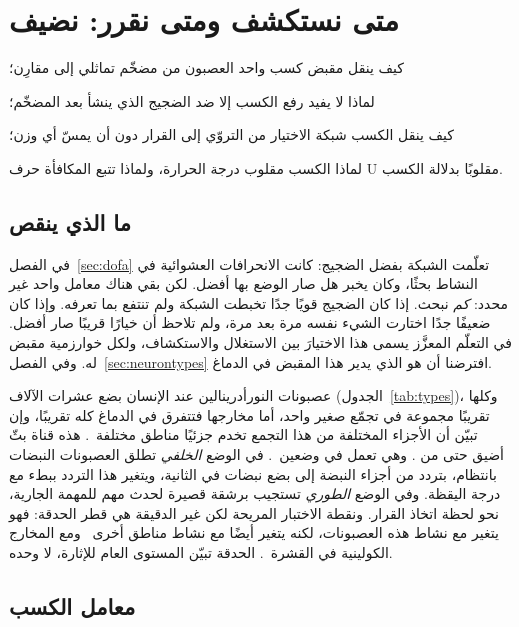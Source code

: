 \chapter{متى نستكشف ومتى نقرر: نضيف }
\label{sec:nora}
\begin{chaptergoals}
\item كيف ينقل مقبض كسب واحد العصبون من مضخّم تماثلي إلى مقارِن؛
\item لماذا لا يفيد رفع الكسب إلا ضد الضجيج الذي ينشأ بعد المضخّم؛
\item كيف ينقل الكسب شبكة الاختيار من التروّي إلى القرار دون أن يمسّ أي وزن؛
\item لماذا الكسب مقلوب درجة الحرارة، ولماذا تتبع المكافأة حرف U مقلوبًا بدلالة الكسب.
\end{chaptergoals}

\section{ما الذي ينقص}

في الفصل~\ref{sec:dofa} تعلّمت الشبكة بفضل الضجيج: كانت الانحرافات العشوائية في النشاط بحثًا، وكان  يخبر هل صار الوضع بها أفضل. لكن بقي هناك معامل واحد غير محدد: \emph{كم} نبحث. إذا كان الضجيج قويًا جدًا تخبطت الشبكة ولم تنتفع بما تعرفه. وإذا كان ضعيفًا جدًا اختارت الشيء نفسه مرة بعد مرة، ولم تلاحظ أن خيارًا قريبًا صار أفضل. في التعلّم المعزَّز يسمى هذا الاختيارَ بين الاستغلال والاستكشاف، ولكل خوارزمية مقبض له. وفي الفصل~\ref{sec:neurontypes} افترضنا أن  هو الذي يدير هذا المقبض في الدماغ.

عصبونات النورأدرينالين عند الإنسان بضع عشرات الآلاف (الجدول~\ref{tab:types})، وكلها تقريبًا مجموعة في تجمّع صغير واحد، أما مخارجها فتتفرق في الدماغ كله تقريبًا، وإن تبيّن أن الأجزاء المختلفة من هذا التجمع تخدم جزئيًا مناطق مختلفة~\cite{Poe2020}. هذه قناة بثّ أضيق حتى من . وهي تعمل في وضعين~\cite{AstonJones2005}. في الوضع \emph{الخلفي} تطلق العصبونات النبضات بانتظام، بتردد من أجزاء النبضة إلى بضع نبضات في الثانية، ويتغير هذا التردد ببطء مع درجة اليقظة. وفي الوضع \emph{الطوري} تستجيب برشقة قصيرة لحدث مهم للمهمة الجارية، نحو لحظة اتخاذ القرار. ونقطة الاختبار المريحة لكن غير الدقيقة هي قطر الحدقة: فهو يتغير مع نشاط هذه العصبونات، لكنه يتغير أيضًا مع نشاط مناطق أخرى~\cite{Joshi2016} ومع المخارج الكولينية في القشرة~\cite{Reimer2016}. الحدقة تبيّن المستوى العام للإثارة، لا  وحده.

\section{معامل الكسب}


